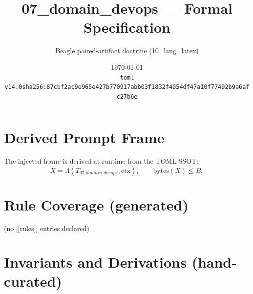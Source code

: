 \documentclass[11pt]{article}
\title{07\_domain\_devops --- Formal Specification}
\author{Beagle paired-artifact doctrine (10\_lang\_latex)}
\date{\today\\ \texttt{toml v14.0\quad sha256:87cbf2ac9e965e427b770917abb03f1832f4054df47a10f77492b9a6afc27b6e}}
\begin{document}
\maketitle

\section{Derived Prompt Frame}
The injected frame is derived at runtime from the TOML SSOT:
\begin{equation}
  X = \Lambda(T_{07\_domain\_devops}, \mathrm{ctx}), \qquad \mathrm{bytes}(X) \le B,
  \label{lbl:derive-frame}
\end{equation}

\section{Rule Coverage (generated)}
(no [[rules]] entries declared)

\section{Invariants and Derivations (hand-curated)}
\end{document}
